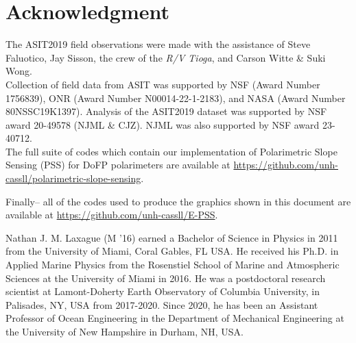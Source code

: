 \documentclass[letterpaper,journal]{IEEEtran}
\begin{document}
\section*{Acknowledgment}

The ASIT2019 field observations were made with the assistance of Steve Faluotico, Jay Sisson, the crew of the \textit{R/V Tioga}, and Carson Witte \& Suki Wong.\\

Collection of field data from ASIT was supported by NSF (Award Number 1756839), ONR (Award Number N00014-22-1-2183), and NASA (Award Number 80NSSC19K1397). Analysis of the ASIT2019 dataset was supported by NSF award 20-49578 (NJML \& CJZ). NJML was also supported by NSF award 23-40712.\\

The full suite of codes which contain our implementation of Polarimetric Slope Sensing (PSS) for DoFP polarimeters are available at \url{https://github.com/unh-cassll/polarimetric-slope-sensing}.

Finally-- all of the codes used to produce the graphics shown in this document are available at \url{https://github.com/unh-cassll/E-PSS}.


\newpage




\newpage

\begin{IEEEbiography}{Nathan J. M. Laxague}
(M '16) earned a Bachelor of Science in Physics in 2011 from the University of Miami, Coral Gables, FL USA. He received his Ph.D. in Applied Marine Physics from the Rosenstiel School of Marine and Atmospheric Sciences at the University of Miami in 2016. He was a postdoctoral research scientist at Lamont-Doherty Earth Observatory of Columbia University, in Palisades, NY, USA from 2017-2020. Since 2020, he has been an Assistant Professor of Ocean Engineering in the Department of Mechanical Engineering at the University of New Hampshire in Durham, NH, USA.
\end{IEEEbiography}
\end{document}
